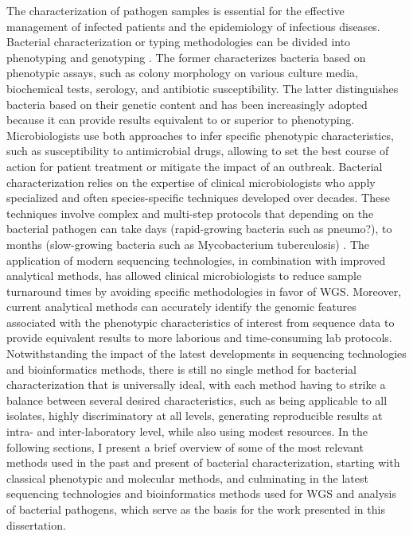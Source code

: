 The characterization of pathogen samples is essential for the effective management of infected patients and the epidemiology of infectious diseases. Bacterial characterization or typing methodologies can be divided into phenotyping and genotyping \cite{li_bacterial_2009}. The former characterizes bacteria based on phenotypic assays, such as colony morphology on various culture media, biochemical tests, serology, and antibiotic susceptibility. The latter distinguishes bacteria based on their genetic content and has been increasingly adopted because it can provide results equivalent to or superior to phenotyping. Microbiologists use both approaches to infer specific phenotypic characteristics, such as susceptibility to antimicrobial drugs, allowing to set the best course of action for patient treatment or mitigate the impact of an outbreak.
Bacterial characterization relies on the expertise of clinical microbiologists who apply specialized and often species-specific techniques developed over decades. These techniques involve complex and multi-step protocols that depending on the bacterial pathogen can take days (rapid-growing bacteria such as pneumo?), to months (slow-growing bacteria such as Mycobacterium tuberculosis) \cite{didelot_transforming_2012}. The application of modern sequencing technologies, in combination with improved analytical methods, has allowed clinical microbiologists to reduce sample turnaround times by avoiding specific methodologies in favor of \ac{WGS}. Moreover, current analytical methods can accurately identify the genomic features associated with the phenotypic characteristics of interest from sequence data to provide equivalent results to more laborious and time-consuming lab protocols. Notwithstanding the impact of the latest developments in sequencing technologies and bioinformatics methods, there is still no single method for bacterial characterization that is universally ideal, with each method having to strike a balance between several desired characteristics, such as being applicable to all isolates, highly discriminatory at all levels, generating reproducible results at intra- and inter-laboratory level, while also using modest resources.
In the following sections, I present a brief overview of some of the most relevant methods used in the past and present of bacterial characterization, starting with classical phenotypic and molecular methods, and culminating in the latest sequencing technologies and bioinformatics methods used for \ac{WGS} and analysis of bacterial pathogens, which serve as the basis for the work presented in this dissertation.

